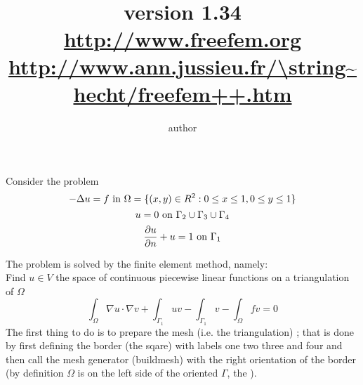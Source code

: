 \documentclass[twoside]{book}
\title{
\DeclareFixedFont{\TitreFont}{\encodingdefault}{pnc}{r}{\shapedefault}{80pt}
 {\Blue{ \TitreFont Freefem++ \\ \vglue 1cm  Manual}} \\ \vglue 5cm  ~ \\  
      \normalsize  { version 1.34  \Red{(Under construction)} }
 \\ \vglue 1cm
 \Large \url{http://www.freefem.org} \\
\url{http://www.ann.jussieu.fr/\string~hecht/freefem++.htm} 
}
\author{author}
\newif\ifpdf
\begin{document}
\graphicspath{{./}{plots/}}
\ifpdf
\DeclareGraphicsExtensions{.pdf, .jpg, .tif}
\else
{}
\fi
\maketitle
\tableofcontents
\let\subsubsection\subsection
\let\subsection\section
\let\section\chapter

\huge

Consider the problem
\begin{equation}
 -\Delta u = f \hbox{ in } \Omega=\{(x,y)\in R^2 : 0 \le x \le 1 , 0 \le y \le 1\}
\end{equation}
\begin{equation}
u=0 \hbox{ on } \Gamma_2 \cup \Gamma_3 \cup \Gamma_4
\end{equation}
\begin{equation}
\frac{\partial u}{\partial n} +u = 1 \hbox{ on } \Gamma_1 
\end{equation}

The problem is solved by the finite element method, namely:
\\
Find $u\in V$ the space of continuous piecewise linear functions
on a triangulation of $\Omega$ 
\begin{equation}
    \int_\Omega \nabla u\cdot\nabla v + \int_{\Gamma_1} uv - \int_{\Gamma_1} v -  \int_\Omega fv  = 0
\end{equation}
The first thing to do is to prepare the mesh (i.e. the triangulation) ;
that is done by first defining the border (the sqare) with labels one two three and four  and then call the mesh generator (buildmesh) with
the right orientation of the border (by definition $\Omega$ is
on the left side of the oriented $\Gamma$, the ).
\end{document}
